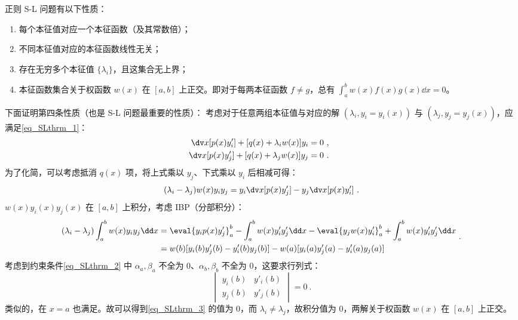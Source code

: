 正则 S-L 问题有以下性质：
\begin{enumerate}
\item 每个本征值对应一个本征函数（及其常数倍）；
\item 不同本征值对应的本征函数线性无关；
\item 存在无穷多个本征值 $\{\lambda_i\}$，且这集合无上界；
\item 本征函数集合关于权函数 $w(x)$ 在 $[a,b]$ 上正交。即对于每两本征函数 $f \neq g$，总有 $\int_a^b w(x)f(x)g(x) \dd x = 0$。 
\end{enumerate}
下面证明第四条性质（也是 S-L 问题最重要的性质）：
考虑对于任意两组本征值与对应的解 $(\lambda_i, y_i=y_i(x))$ 与 $(\lambda_j, y_j=y_j(x))$，应满足\autoref{eq_SLthrm_1}：
\begin{equation}
\begin{aligned}
\dv x [p(x) y'_i] + [q(x) + \lambda_i w(x)] y_i &= 0 ~,\\
\dv x [p(x) y'_j] + [q(x) + \lambda_j w(x)] y_j &= 0 ~.
\end{aligned} ~~
\end{equation}
为了化简，可以考虑抵消 $q(x)$ 项，将上式乘以 $y_j$、下式乘以 $y_i$ 后相减可得：
\begin{equation}
(\lambda_i - \lambda_j)w(x) y_i y_j = y_i \dv x [p(x) y'_j] - y_j \dv x [p(x) y'_i] ~.
\end{equation}
$w(x)y_i(x) y_j(x)$ 在 $[a, b]$ 上积分，考虑 IBP（分部积分）：
\begin{equation}\label{eq_SLthrm_3}
\begin{aligned}
(\lambda_i - \lambda_j) \int_a^b w(x) y_i y_j \dd x &= \eval{y_i p(x) y'_j}_a^b - \int_a^b w(x) y'_i y'_j \dd x - \eval{y_j w(x) y'_i}_a^b + \int_a^b w(x) y'_i y'_j \dd x\\
&= w(b) [y_i(b) y'_j(b) - y'_i(b) y_j(b)] - w(a) [y_i(a) y'_j(a) - y'_i(a) y_j(a)] 
\end{aligned} ~.
\end{equation}
考虑到约束条件\autoref{eq_SLthrm_2} 中 $\alpha_a, \beta_a$ 不全为 $0$、$\alpha_b, \beta_b$ 不全为 $0$，这要求行列式：
\begin{equation}
\begin{vmatrix}
y_i(b) & y'_i(b) \\
y_j(b) & y'_j(b)
\end{vmatrix} = 0~.
\end{equation}
类似的，在 $x=a$ 也满足。故可以得到\autoref{eq_SLthrm_3} 的值为 $0$，而 $\lambda_i \neq \lambda_j$，故积分值为 $0$，两解关于权函数 $w(x)$ 在 $[a, b]$ 上正交。


